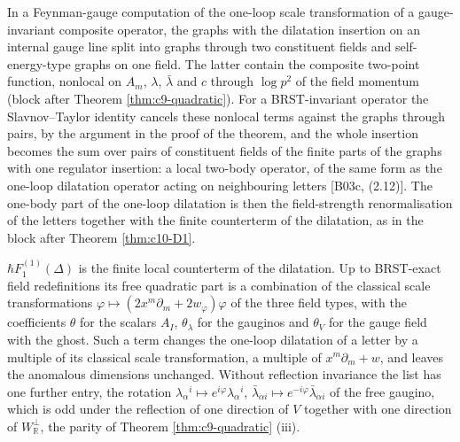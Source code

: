 \begin{remark}
In a Feynman-gauge computation of the one-loop scale transformation of a gauge-invariant composite operator, the graphs with the dilatation insertion on an internal gauge line split into graphs through two constituent fields and self-energy-type graphs on one field. The latter contain the composite two-point function, nonlocal on $A_m$, $\lambda$, $\bar\lambda$ and $c$ through $\log p^2$ of the field momentum (block after Theorem \ref{thm:c9-quadratic}). For a BRST-invariant operator the Slavnov--Taylor identity cancels these nonlocal terms against the graphs through pairs, by the argument in the proof of the theorem, and the whole insertion becomes the sum over pairs of constituent fields of the finite parts of the graphs with one regulator insertion: a local two-body operator, of the same form as the one-loop dilatation operator acting on neighbouring letters [B03c, (2.12)]. The one-body part of the one-loop dilatation is then the field-strength renormalisation of the letters together with the finite counterterm of the dilatation, as in the block after Theorem \ref{thm:c10-D1}.
\end{remark}

\begin{remark}
$\hbar F_1^{(1)}(\Delta)$ is the finite local counterterm of the dilatation. Up to BRST-exact field redefinitions its free quadratic part is a combination of the classical scale transformations $\varphi\mapsto(2x^m\partial_m+2w_\varphi)\varphi$ of the three field types, with the coefficients $\theta$ for the scalars $A_I$, $\theta_\lambda$ for the gauginos and $\theta_V$ for the gauge field with the ghost. Such a term changes the one-loop dilatation of a letter by a multiple of its classical scale transformation, a multiple of $x^m\partial_m+w$, and leaves the anomalous dimensions unchanged. Without reflection invariance the list has one further entry, the rotation $\lambda_\alpha{}^i\mapsto e^{i\varphi}\lambda_\alpha{}^i$, $\bar\lambda_{\dot\alpha i}\mapsto e^{-i\varphi}\bar\lambda_{\dot\alpha i}$ of the free gaugino, which is odd under the reflection of one direction of $V$ together with one direction of $W_{\mathbb R}^\perp$, the parity of Theorem \ref{thm:c9-quadratic} (iii).
\end{remark}

